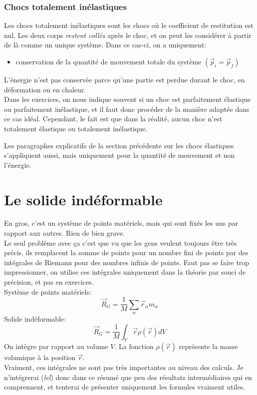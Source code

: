 \documentclass{article}
\numberwithin{equation}{section}
\begin{document}
\subsubsection{Chocs totalement inélastiques}
Les chocs totalement inélastiques sont les chocs où le coefficient de restitution est nul. Les deux corps \emph{restent collés} après le choc, et on peut les considérer à partir de là comme un unique système.
Dans ce cas-ci, on a uniquement:
\begin{itemize}
	\item conservation de la quantité de mouvement totale du système \((\vec p_i = \vec p_f)\)
\end{itemize}
L'énergie n'est pas conservée parce qu'une partie est perdue durant le choc, en déformation ou en chaleur. \\

Dans les exercices, on nous indique souvent si un choc est parfaitement élastique ou parfaitement inélastique, et il faut donc procéder de la manière adaptée dans ce cas idéal. Cependant, le fait est que dans la réalité, aucun choc n'est totalement élastique ou totalement inélastique.

Les paragraphes explicatifs de la section précédente sur les chocs élastiques s'appliquent aussi, mais uniquement pour la quantité de mouvement et non l'énergie.

\section{Le solide indéformable} \label{sec:solideindeformable}
En gros, c'est un système de points matériels, mais qui sont fixés les uns par rapport aux autres. Rien de bien grave. \\
Le seul problème avec ça c'est que vu que les gens veulent toujours être très précis, ils remplacent la somme de points pour un nombre fini de points par des intégrales de Riemann pour des nombres infinis de points. Faut pas se faire trop impressionner, on utilise ces intégrales uniquement dans la théorie par souci de précision, et pas en exercices. \\

Système de points matériels:
\begin{equation*}
	\vec R_G = \frac{1}{M} \sum_\alpha \vec r_\alpha m_\alpha
\end{equation*}
Solide indéformable:
\begin{equation*}
	\vec R_G = \frac{1}{M} \int_V \vec r \rho(\vec r) dV
\end{equation*}
On intègre par rapport au volume \(V\). La fonction \(\rho (\vec r)\) représente la masse volumique à la position \(\vec r\). \\
Vraiment, ces intégrales ne sont pas très importantes au niveau des calculs. Je n'intégrerai (\emph{lel}) donc dans ce résumé que peu des résultats intermédiaires qui en comprennent, et tenterai de présenter uniquement les formules vraiment utiles. \\
\end{document}

